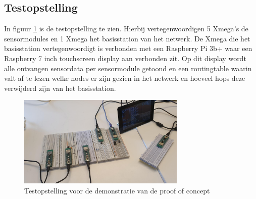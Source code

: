 \documentclass[a4paper, 11pt]{article}
\begin{document}
\subsection{Testopstelling} \label{Testopstelling}
In figuur \ref{testopstelling} is de testopstelling te zien. Hierbij vertegenwoordigen 5 Xmega's de sensormodules en 1 Xmega het basisstation van het netwerk. De Xmega die het basisstation vertegenwoordigt is verbonden met een Raspberry Pi 3b+  waar een Raspberry 7 inch touchscreen display aan verbonden zit. Op dit display wordt alle ontvangen sensordata per sensormodule getoond en een routingtable waarin valt af te lezen welke nodes er zijn gezien in het netwerk en hoeveel hops deze verwijderd zijn van het basisstation.
\begin{figure}[h!]
	\centering
	\includegraphics[width=8cm]{media/TestOpstellingNetwerk.jpeg}
	\caption{Testopstelling voor de demonstratie van de proof of concept} \label{testopstelling}
\end{figure}

\newpage
\end{document}
